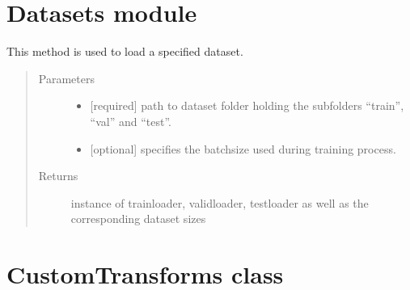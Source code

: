 \documentclass[letterpaper,10pt,english,openany,oneside]{sphinxmanual}
\begin{document}
\section{Datasets module}
\label{\detokenize{Datasets:module-stc.Datasets}}\label{\detokenize{Datasets:datasets-module}}\label{\detokenize{Datasets::doc}}

\begin{fulllineitems}
\label{\detokenize{Datasets:stc.Datasets.loadDatasetFromFolder}}
This method is used to load a specified dataset.
\begin{quote}\begin{description}
\item[{Parameters}] \leavevmode\begin{itemize}
\item {} 
 \textendash{} {[}required{]} path to dataset folder holding the subfolders “train”, “val” and “test”.

\item {} 
 \textendash{} {[}optional{]} specifies the batchsize used during training process.

\end{itemize}

\item[{Returns}] \leavevmode
instance of trainloader, validloader, testloader as well as the corresponding dataset sizes

\end{description}\end{quote}

\end{fulllineitems}



\section{CustomTransforms class}
\label{\detokenize{CustomTransforms:customtransforms-class}}\label{\detokenize{CustomTransforms::doc}}
\end{document}
